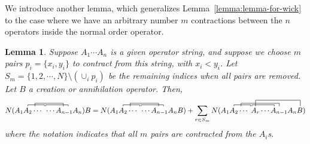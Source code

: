 \documentclass{report}
\theoremstyle{plain}
\newtheorem{lemma}{Lemma}[chapter]
\theoremstyle{definition}
\begin{document}
We introduce another lemma, which generalizes
Lemma~\ref{lemma:lemma-for-wick} to the case where we have an
arbitrary number $m$ contractions between the $n$ operators inside the
normal order operator.
\begin{lemma}\label{lemma:wick2}
  Suppose $A_1 \cdots A_n$ is a given operator string, and suppose we
  choose $m$ pairs $p_i = \{x_i, y_i\} $ to contract from this string, with $x_i <
  y_i$. Let $S_m = \{1,2,\cdots,N\} \setminus (\cup_i p_i)$ be the
  remaining indices when all pairs are removed. Let $B$ a creation
  or annihilation operator. Then,
  \begin{equation}
    N({A_1 \contraction[.5ex]{}{A_2}{\cdots}{\;} A_2
    \contraction[1ex]{}{A}{\cdots\;\cdots}{A} \cdots
    \contraction[.5ex]{}{A}{\cdots}{A_{n-1}} \; \cdots A_{n-1}
    A_n}) B = N(A_1 \contraction[.5ex]{}{A_2}{\cdots}{\;} A_2
    \contraction[1ex]{}{A}{\cdots\;\cdots}{A} \cdots
    \contraction[.5ex]{}{A}{\cdots}{A_{n-1}} \; \cdots A_{n-1}
    A_n B) + \sum_{r\in S_m} N(A_1 \contraction[.5ex]{}{A_2}{\cdots}{\;} A_2
    \contraction[1ex]{}{A}{\cdots\;A_r \cdots}{A} \cdots
    \contraction[.5ex]{}{A}{\cdots}{A_{n-1}} \;
    \contraction[2ex]{}{A_r}{\cdots A_{n-1} A_n}{B} A_r \cdots A_{n-1}
    A_n B)  \label{eq:l1}
  \end{equation}
  where the notation indicates that all $m$ pairs are contracted from
  the $A_i$s.
\end{lemma}
\end{document}
